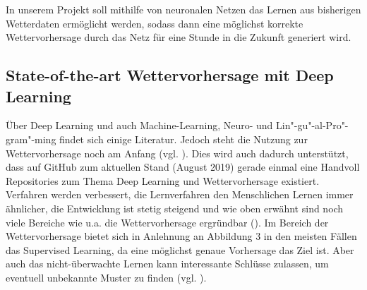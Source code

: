 In unserem Projekt soll mithilfe von neuronalen Netzen das Lernen aus bisherigen Wetterdaten ermöglicht werden, sodass dann eine möglichst korrekte Wettervorhersage durch das Netz für eine Stunde in die Zukunft generiert wird.

\subsection{State-of-the-art Wettervorhersage mit Deep Learning}
Über Deep Learning und auch Machine-Learning, Neuro- und Lin"-gu"-al-Pro"-gram"-ming findet sich einige Literatur. Jedoch steht die Nutzung zur Wettervorhersage noch am Anfang (vgl. \cite{ChristophFrohlich.2019}). Dies wird auch dadurch unterstützt, dass auf GitHub zum aktuellen Stand (August 2019) gerade einmal eine Handvoll Repositories zum Thema Deep Learning und Wettervorhersage existiert. Verfahren werden verbessert, die Lernverfahren den Menschlichen Lernen immer ähnlicher, die Entwicklung ist stetig steigend und wie oben erwähnt sind noch viele Bereiche wie u.a. die Wettervorhersage  ergründbar (\cite[S. 103]{Wick.2017}). Im Bereich der Wettervorhersage bietet sich in Anlehnung an Abbildung 3 in den meisten Fällen das Supervised Learning, da eine möglichst genaue Vorhersage das Ziel ist. Aber auch das  nicht-überwachte Lernen kann interessante Schlüsse zulassen, um eventuell unbekannte Muster zu finden (vgl. \cite[S. 371]{Welsch.2018}). 
